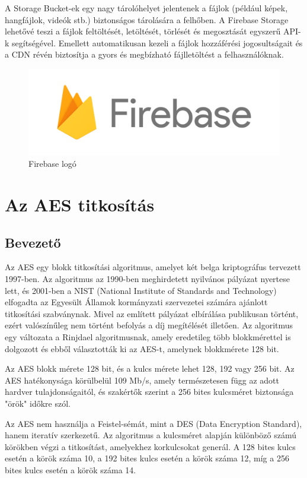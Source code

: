 A Storage Bucket-ek egy nagy tárolóhelyet jelentenek a fájlok (például képek, hangfájlok, videók stb.) biztonságos tárolására a felhőben. A Firebase Storage lehetővé teszi a fájlok feltöltését, letöltését, törlését és megosztását egyszerű API-k segítségével. Emellett automatikusan kezeli a fájlok hozzáférési jogosultságait és a CDN révén biztosítja a gyors és megbízható fájlletöltést a felhasználóknak.

\begin{figure}[!h]
	\centering
	\includegraphics[scale=0.2]{images/firebaseLogo}
	\caption{Firebase logó}
	\label{abra:firebaseLogo}
\end{figure}

\section {Az AES titkosítás}
\subsection {Bevezető}

Az AES egy blokk titkosítási algoritmus, amelyet két belga kriptográfus tervezett 1997-ben. Az algoritmus az 1990-ben meghirdetett nyilvános pályázat nyertese lett, és 2001-ben a NIST (National Institute of Standards and Technology) elfogadta az Egyesült Államok kormányzati szervezetei számára ajánlott titkosítási szabványnak. Mivel az említett pályázat elbírálása publikusan történt, ezért valószínűleg nem történt befolyás a díj megítélését illetően. Az algoritmus egy változata a Rinjdael algoritmusnak, amely eredetileg több blokkmérettel is dolgozott és ebből választották ki az AES-t, amelynek blokkmérete 128 bit.

Az AES blokk mérete 128 bit, és a kulcs mérete lehet 128, 192 vagy 256 bit. Az AES hatékonysága körülbelül 109 Mb/s, amely természetesen függ az adott hardver tulajdonságaitól, és szakértők szerint a 256 bites kulcsméret biztonsága "örök" időkre szól.

Az AES nem használja a Feistel-sémát, mint a DES (Data Encryption Standard), hanem iteratív szerkezetű. Az algoritmus a kulcsméret alapján különböző számú körökben végzi a titkosítást, amelyekhez korkulcsokat generál. A 128 bites kulcs esetén a körök száma 10, a 192 bites kulcs esetén a körök száma 12, míg a 256 bites kulcs esetén a körök száma 14.

